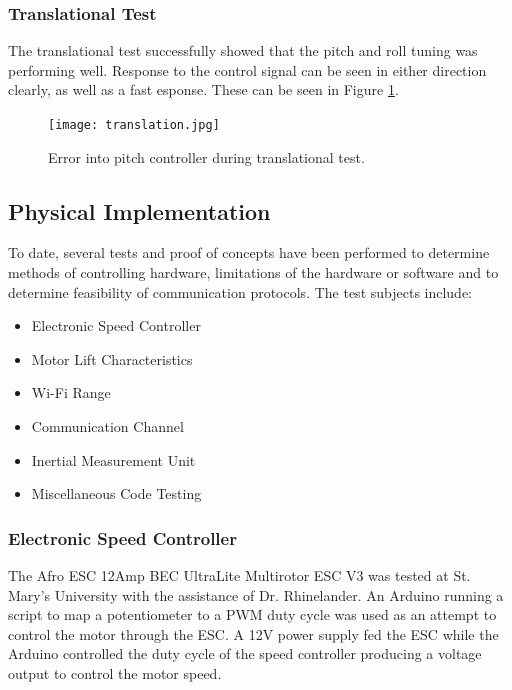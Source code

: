 \subsubsection{Translational Test}
The translational test successfully showed that the pitch and roll tuning was performing well. Response to the control signal can be seen in either direction clearly, as well as a fast esponse.  These can be seen in Figure \ref{fig:translation}.

\begin{figure}[h]
	\centering
	\texttt{[image: translation.jpg]}
	\caption{Error into pitch controller during translational test.}
	\label{fig:translation}
\end{figure}



\subsection{Physical Implementation}

  To date, several tests and proof of concepts have been performed to determine methods of controlling hardware, limitations of the hardware or software and to determine feasibility of communication protocols. The test subjects include:
  
\begin{itemize}
  \item{Electronic Speed Controller}
  \item{Motor Lift Characteristics}
  \item{Wi-Fi Range}
  \item{Communication Channel}
  \item{Inertial Measurement Unit}
  \item{Miscellaneous Code Testing}
 \end{itemize}

  \subsubsection{Electronic Speed Controller}
  
The Afro ESC 12Amp BEC UltraLite Multirotor ESC V3 was tested at St. Mary's University with the assistance of Dr. Rhinelander. An Arduino running a script to map a potentiometer to a PWM duty cycle was used as an attempt to control the motor through the ESC. A 12V power supply fed the ESC while the Arduino controlled the duty cycle of the speed controller producing a voltage output to control the motor speed. 

